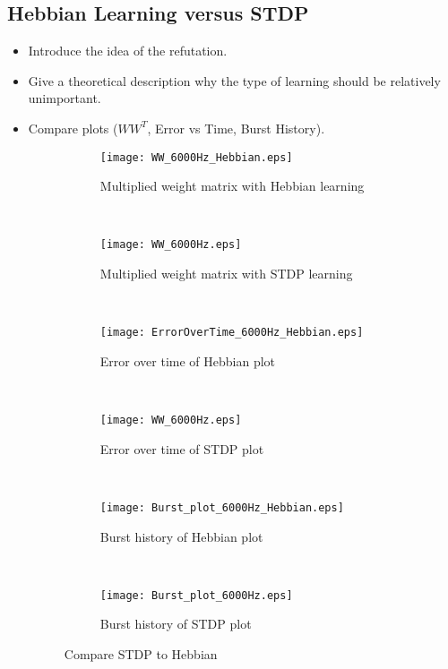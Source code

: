 \subsection{Hebbian Learning versus STDP}

\begin{itemize}
\item Introduce the idea of the refutation. 
\item Give a theoretical description why the type of learning should be relatively unimportant.
\item Compare plots (\(WW^T\), Error vs Time, Burst History).

\begin{figure}[H]
\centering
\begin{subfigure}[b]{0.49\textwidth}
\texttt{[image: WW\_6000Hz\_Hebbian.eps]}
\label{Compare: WW_Hebbian}
\caption{Multiplied weight matrix with Hebbian learning}
\end{subfigure}
\,
\begin{subfigure}[b]{0.49\textwidth}
\texttt{[image: WW\_6000Hz.eps]}
\label{Compare: WW_STDP}
\caption{Multiplied weight matrix with STDP learning}
\end{subfigure}
\\
\begin{subfigure}[b]{0.49\textwidth}
\texttt{[image: ErrorOverTime\_6000Hz\_Hebbian.eps]}
\label{Compare: EoT_Hebbian}
\caption{Error over time of Hebbian plot}
\end{subfigure}
\,
\begin{subfigure}[b]{0.49\textwidth}
\texttt{[image: WW\_6000Hz.eps]}
\label{Compare: EoT_STDP}
\caption{Error over time of STDP plot}
\end{subfigure}
\\
\begin{subfigure}[b]{0.49\textwidth}
\texttt{[image: Burst\_plot\_6000Hz\_Hebbian.eps]}
\label{Compare: BH_Hebbian}
\caption{Burst history of Hebbian plot}
\end{subfigure}
\,
\begin{subfigure}[b]{0.49\textwidth}
\texttt{[image: Burst\_plot\_6000Hz.eps]}
\label{Compare: BH_STDP}
\caption{Burst history of STDP plot}
\end{subfigure}
\label{Compare}
\caption{Compare STDP to Hebbian}
\end{figure}
\end{itemize}